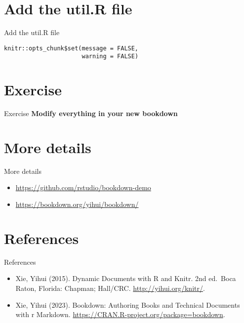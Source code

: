 \documentclass[
  ignorenonframetext,
]{beamer}
\providecommand{\tightlist}{%
  \setlength{\itemsep}{0pt}\setlength{\parskip}{0pt}}
\begin{document}
\hypertarget{add-the-util.r-file}{%
\section{Add the util.R file}\label{add-the-util.r-file}}

\begin{frame}[fragile]{Add the util.R file}
\protect\hypertarget{add-the-util.r-file-1}{}
\begin{verbatim}
knitr::opts_chunk$set(message = FALSE, 
                      warning = FALSE)
\end{verbatim}
\end{frame}

\hypertarget{exercise}{%
\section{Exercise}\label{exercise}}

\begin{frame}{Exercise}
\protect\hypertarget{exercise-1}{}
\textbf{Modify everything in your new bookdown}
\end{frame}

\hypertarget{more-details}{%
\section{More details}\label{more-details}}

\begin{frame}{More details}
\protect\hypertarget{more-details-1}{}
\begin{itemize}
\tightlist
\item
  \url{https://github.com/rstudio/bookdown-demo}
\item
  \url{https://bookdown.org/yihui/bookdown/}
\end{itemize}
\end{frame}

\hypertarget{references}{%
\section{References}\label{references}}

\begin{frame}{References}
\protect\hypertarget{references-1}{}
\begin{itemize}
\item
  Xie, Yihui (2015). Dynamic Documents with R and Knitr. 2nd ed.~Boca
  Raton, Florida: Chapman; Hall/CRC. \url{http://yihui.org/knitr/}.
\item
  Xie, Yihui (2023). Bookdown: Authoring Books and Technical Documents
  with r Markdown. \url{https://CRAN.R-project.org/package=bookdown}.
\end{itemize}
\end{frame}
\end{document}
